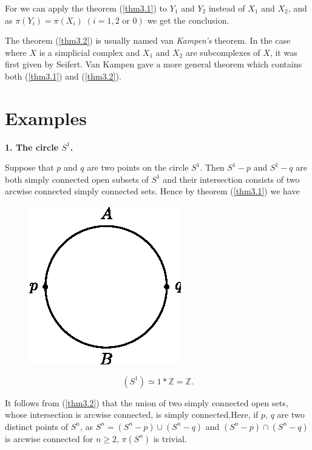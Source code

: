    For we can apply the theorem (\ref{thm3.1}) to $Y_1$ and $Y_2$ instead of
   $X_1$ and $X_2$, and as $\pi(Y_i) =  \pi(X_i) \; (i  = 1,2
   \text{ or } 0)$ we get the conclusion. 
      
\begin{note*}
 The theorem (\ref{thm3.2}) is usually named van {\em Kampen's} theorem. In
 the case where $X$ is a simplicial complex and $X_1$ and $X_2$ are
 subcomplexes of $X$,  it was first given by Seifert. Van Kampen gave
 a more general theorem which contains both (\ref{thm3.1}) and
 (\ref{thm3.2}).  
\end{note*}   

\section{Examples}\label{sec4} %

\medskip
\noindent\textbf{1. The circle {\boldmath$S^1$}.}\pageoriginale

Suppose that $p$ and $q$ are two points on the circle $S^1$. Then $S^1 
- p$ and $S^1 -q$ are both simply connected open subsets of $S^1$ and
their intersection consists of two arcwise connected simply connected
sets. Hence by theorem (\ref{thm3.1}) we have  
\begin{figure}[H]
\centering
\includegraphics{vol44-fig/fig44-6.eps}
\end{figure}
$$
(S^1) \simeq 1 \ast \mathbb{Z} = \mathbb{Z}.  
$$

\medskip
{}  

It follows from (\ref{thm3.2}) that the union of two simply  connected open
sets, whose intersection is arcwise connected, is simply
connected.\break Here, if $p$, $q$ are two distinct points of $S^n$, as $S^n
= (S^n -p) \cup (S^n -q)$ and $(S^n -p) \cap (S^n -q)$ is arcwise
connected for $n \ge 2$, $\pi (S^n)$ is trivial. 

